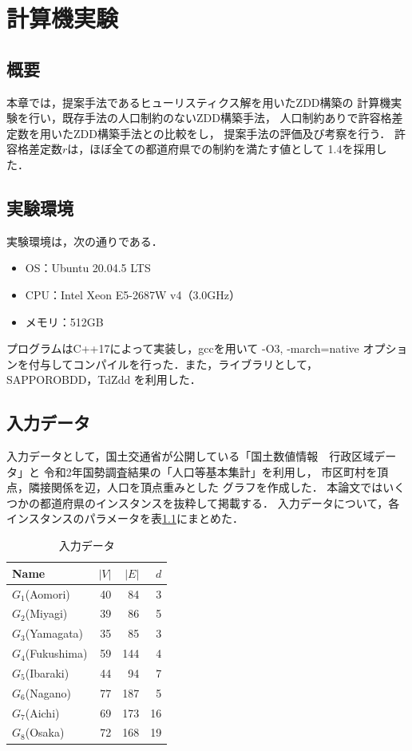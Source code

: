 \chapter{計算機実験} \label{chapter:5}

\section{概要}
本章では，提案手法であるヒューリスティクス解を用いたZDD構築の
計算機実験を行い，既存手法の人口制約のないZDD構築手法，
人口制約ありで許容格差定数を用いたZDD構築手法との比較をし，
提案手法の評価及び考察を行う．
許容格差定数$r$は，ほぼ全ての都道府県での制約を満たす値として
1.4を採用した．

\section{実験環境}
実験環境は，次の通りである．

\begin{itemize}
  \item OS：Ubuntu 20.04.5 LTS
  \item CPU：Intel Xeon E5-2687W v4（3.0GHz）
  \item メモリ：512GB
\end{itemize}

プログラムはC++17によって実装し，gccを用いて -O3, -march=native
オプションを付与してコンパイルを行った．また，ライブラリとして，
SAPPOROBDD，TdZdd を利用した．

\section{入力データ}
入力データとして，国土交通省が公開している「国土数値情報　行政区域データ」と
令和2年国勢調査結果の「人口等基本集計」を利用し，
市区町村を頂点，隣接関係を辺，人口を頂点重みとした
グラフを作成した．
本論文ではいくつかの都道府県のインスタンスを抜粋して掲載する．
入力データについて，各インスタンスのパラメータを表\ref{input_data}にまとめた．

\begin{table}[htbp]
  \caption{入力データ}
  \label{input_data}
  \centering
  \begin{tabular}{l|rrr}
    \hline
    Name & $|V|$ & $|E|$ & $d$ \\
    \hline \hline
    $G_1$(Aomori) & 40 & 84 & 3 \\
    $G_2$(Miyagi) & 39 & 86 & 5 \\
    $G_3$(Yamagata) & 35 & 85 & 3 \\
    $G_4$(Fukushima) & 59 & 144 & 4 \\
    $G_5$(Ibaraki) & 44 & 94 & 7 \\
    $G_6$(Nagano) & 77 & 187 & 5 \\
    $G_7$(Aichi) & 69 & 173 & 16 \\
    $G_8$(Osaka) & 72 & 168 & 19 \\
    \hline
  \end{tabular}
\end{table}

